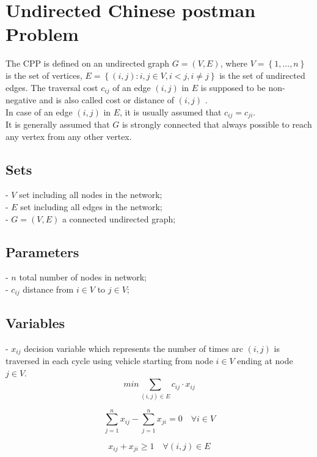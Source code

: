 \documentclass[a4paper,12pt,titlepage]{article}
\begin{document}
	\section*{Undirected Chinese postman Problem}

The CPP is defined on an undirected graph $G=(V,E)$, where $V=\left\lbrace 1,…, n\right\rbrace $ is the set of vertices, $E =\left\lbrace (i,j)
: i, j\in V, i<j, i\neq j\right\rbrace $ is the set of undirected edges. The traversal cost $c_{ij}$ of an edge $(i,j)$ in $E$ is supposed to be non-negative and is also called cost or distance of $(i,j)$ .\\ 
In case of an edge $(i,j)$ in $E$, it is usually assumed that $c_{ij} = c_ {ji}$. \\
It is generally assumed that $G$ is strongly connected that always possible to reach any vertex from any other vertex.
\subsection*{Sets}
- $V$ set including all nodes in the network;\\
- $E$ set including all edges in the network;\\
- $G=(V,E)$ a connected undirected graph;
\subsection*{Parameters}
- $n$ total number of nodes in network;\\
- $c_{ij}$ distance from $i \in V$ to $j \in V$;
\subsection*{Variables}
- $x_{ij}$ decision variable which represents the number of times arc $(i,j)$ is traversed in each cycle using vehicle starting from node $i\in V$ ending at node $j\in V$.
\begin{equation}
min \sum_{(i,j)\in E}c_{ij} \cdot x_{ij}
\end{equation}

\begin{equation}
\sum_{j=1}^{n} x_{ij} - \sum_{j=1}^{n} x_{ji} = 0 \quad \forall i\in V
\end{equation}

\begin{equation}
x_{ij} + x_{ji} \geq 1 \quad \forall (i,j)\in E
\end{equation}
\end{document}
